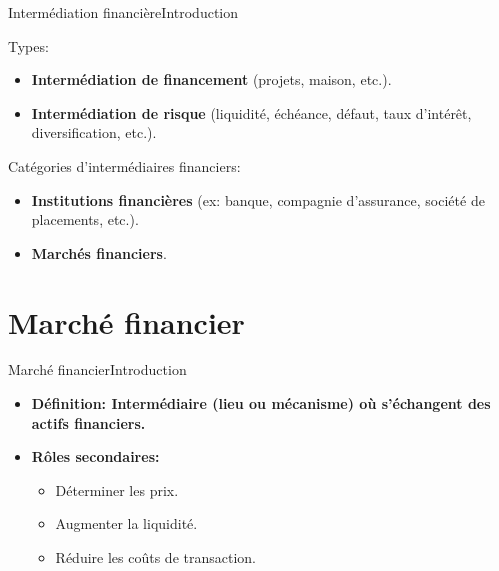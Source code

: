 \documentclass{beamer}
\begin{document}
\begin{frame}{Intermédiation financière}{Introduction}
\begin{block}{Types:}
\begin{itemize}
\item \textbf{Intermédiation de financement} (projets, maison, etc.).
\item \textbf{Intermédiation de risque} (liquidité, échéance, défaut, taux d’intérêt, diversification, etc.).
\end{itemize}
\end{block}
\begin{block}{Catégories d’intermédiaires financiers:}
\begin{itemize}
\item \textbf{Institutions financières} (ex: banque, compagnie
d’assurance, société de placements, etc.).
\item \textbf{Marchés financiers}.
\end{itemize}
\end{block}

\end{frame}

\section{Marché financier}
\begin{frame}{Marché financier}{Introduction}
\begin{itemize}
\item \textbf{Définition: Intermédiaire (lieu ou mécanisme) où s’échangent des actifs financiers.}
\item \textbf{Rôles secondaires:}
\begin{itemize}
\item Déterminer les prix.
\item Augmenter la liquidité.
\item Réduire les coûts de transaction.
\end{itemize}
\end{itemize}
\end{frame}
\end{document}
